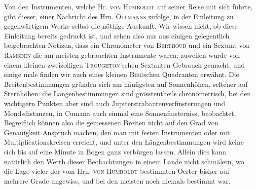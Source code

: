Von den Instrumenten, welche Hr. \textsc{von Humboldt} auf seiner Reise mit sich führte, gibt dieser, einer Nachricht des Hrn. \textsc{Oltmanns} zufolge, in der Einleitung zu gegenwärtigem Werke selbst die nöthige Auskunft. Wir wissen nicht, ob diese Einleitung bereits gedruckt ist, und sehen also nur aus einigen gelegentlich beigebrachten Notizen, dass ein Chronometer von \textsc{Berthoud} und ein Sextant von \textsc{Ramsden} die am meisten gebrauchten Instrumente waren; zuweilen wurde von einem kleinen zweizolligen \textsc{Troughton}'schen Sextanten Gebrauch gemacht, und einige male finden wir auch eines kleinen \textsc{Bird}schen Quadranten erwähnt. Die Breitenbestimmungen gründen sich am häufigsten auf Sonnenhöhen, seltener auf Sternhöhen: die Längenbestimmungen sind grösstentheils chronometrisch, bei den wichtigern Punkten aber sind auch Jupiterstrabantenverfinsterungen und Mondsdistanzen, in Cumana auch einmal eine Sonnenfinsterniss, beobachtet. Begreiflich können also die gemessenen Breiten nicht auf den Grad von Genauigkeit Anspruch machen, den man mit festen Instrumenten oder mit Multiplicationskreisen erreicht, und unter den Längenbestimmungen wird keine sich bis auf eine Minute in Bogen ganz verbürgen lassen. Allein dies kann natürlich den Werth dieser Beobachtungen in einem Lande nicht schmälern, wo die Lage vieler der vom Hrn. \textsc{von Humboldt} bestimmten Oerter bisher auf mehrere Grade ungewiss, und bei den meisten noch niemals bestimmt war.

